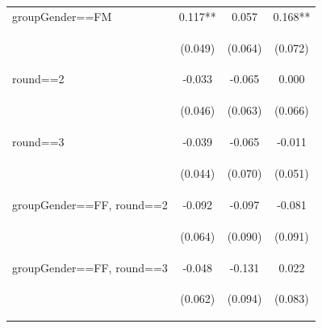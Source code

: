 \documentclass{article} %
\begin{document}
\begin{table}[H]
\begin{center}
\begin{tabular}{lccc}
groupGender==FM & 0.117** & 0.057 & 0.168** \\
\vspace{4pt} & \begin{footnotesize}(0.049)\end{footnotesize} & \begin{footnotesize}(0.064)\end{footnotesize} & \begin{footnotesize}(0.072)\end{footnotesize} \\
round==2 & -0.033 & -0.065 & 0.000 \\
\vspace{4pt} & \begin{footnotesize}(0.046)\end{footnotesize} & \begin{footnotesize}(0.063)\end{footnotesize} & \begin{footnotesize}(0.066)\end{footnotesize} \\
round==3 & -0.039 & -0.065 & -0.011 \\
\vspace{4pt} & \begin{footnotesize}(0.044)\end{footnotesize} & \begin{footnotesize}(0.070)\end{footnotesize} & \begin{footnotesize}(0.051)\end{footnotesize} \\
groupGender==FF, round==2 & -0.092 & -0.097 & -0.081 \\
\vspace{4pt} & \begin{footnotesize}(0.064)\end{footnotesize} & \begin{footnotesize}(0.090)\end{footnotesize} & \begin{footnotesize}(0.091)\end{footnotesize} \\
groupGender==FF, round==3 & -0.048 & -0.131 & 0.022 \\
\vspace{4pt} & \begin{footnotesize}(0.062)\end{footnotesize} & \begin{footnotesize}(0.094)\end{footnotesize} & \begin{footnotesize}(0.083)\end{footnotesize} \\

\end{tabular}
\end{center}
\end{table}
\end{document}

